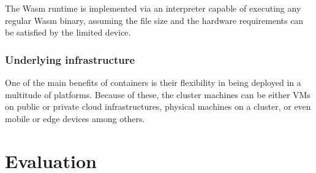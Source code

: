 The Wasm runtime is implemented via an interpreter capable of executing any regular Wasm binary, assuming the file size and the hardware requirements can be satisfied by the limited device.

\subsubsection{Underlying infrastructure}

One of the main benefits of containers is their flexibility in being deployed in a multitude of platforms. Because of these, the cluster machines can be either VMs on public or private cloud infrastructures, physical machines on a cluster, or even mobile or edge devices among others.

\section{Evaluation}
\label{sec:evaluation}






